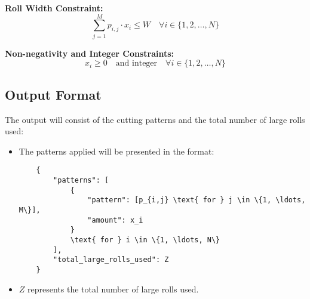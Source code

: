 \documentclass{article}
\begin{document}
\textbf{Roll Width Constraint:}
\begin{equation}
\sum_{j=1}^{M} p_{i,j} \cdot x_i \leq W \quad \forall i \in \{1, 2, \ldots, N\}
\end{equation}

\textbf{Non-negativity and Integer Constraints:}
\begin{equation}
x_i \geq 0 \quad \text{and integer} \quad \forall i \in \{1, 2, \ldots, N\}
\end{equation}

\subsection*{Output Format}
The output will consist of the cutting patterns and the total number of large rolls used:
\begin{itemize}
    \item The patterns applied will be presented in the format:
    \begin{verbatim}
    {
        "patterns": [
            {
                "pattern": [p_{i,j} \text{ for } j \in \{1, \ldots, M\}],
                "amount": x_i
            }
            \text{ for } i \in \{1, \ldots, N\}
        ],
        "total_large_rolls_used": Z
    }
    \end{verbatim}
    \item $Z$ represents the total number of large rolls used.
\end{itemize}
\end{document}
